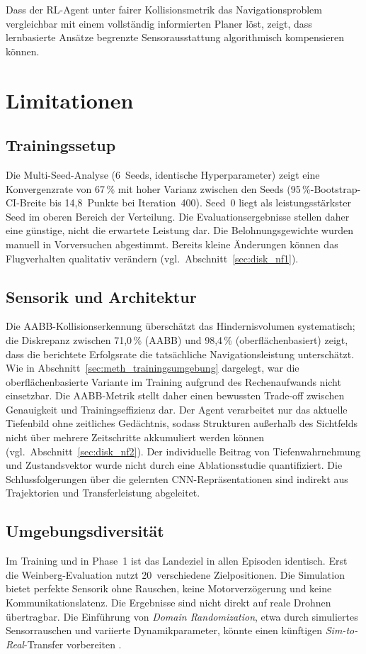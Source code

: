 Dass der RL-Agent unter fairer
Kollisionsmetrik das Navigationsproblem vergleichbar mit einem
vollständig informierten Planer löst, zeigt,
dass lernbasierte Ansätze begrenzte Sensorausstattung algorithmisch
kompensieren können.

\section{Limitationen}
\label{sec:disk_limitationen}


\subsection{Trainingssetup}

Die Multi-Seed-Analyse (6~Seeds, identische Hyperparameter) zeigt eine
Konvergenzrate von 67\,\% mit hoher Varianz zwischen den Seeds
(95\,\%-Bootstrap-CI-Breite bis 14,8~Punkte bei Iteration~400). Seed~0
liegt als leistungsstärkster Seed im oberen Bereich der Verteilung. Die
Evaluationsergebnisse stellen daher eine günstige, nicht die erwartete
Leistung dar. Die Belohnungsgewichte wurden manuell in Vorversuchen abgestimmt. Bereits
kleine Änderungen können das Flugverhalten qualitativ verändern
(vgl.\ Abschnitt~\ref{sec:disk_nf1}).

\subsection{Sensorik und Architektur}

Die AABB-Kollisionserkennung überschätzt das Hindernisvolumen
systematisch; die Diskrepanz zwischen 71,0\,\% (AABB) und 98,4\,\%
(oberflächenbasiert) zeigt, dass die berichtete Erfolgsrate die
tatsächliche Navigationsleistung unterschätzt. Wie in
Abschnitt~\ref{sec:meth_trainingsumgebung} dargelegt, war die
oberflächenbasierte Variante im Training aufgrund des Rechenaufwands
nicht einsetzbar. Die AABB-Metrik stellt daher einen bewussten
Trade-off zwischen Genauigkeit und Trainingseffizienz dar. Der Agent verarbeitet
nur das aktuelle Tiefenbild ohne zeitliches Gedächtnis, sodass
Strukturen außerhalb des Sichtfelds nicht über mehrere Zeitschritte
akkumuliert werden können (vgl.\ Abschnitt~\ref{sec:disk_nf2}). Der
individuelle Beitrag von Tiefenwahrnehmung und Zustandsvektor wurde
nicht durch eine Ablationsstudie quantifiziert. Die Schlussfolgerungen
über die gelernten CNN-Repräsentationen sind indirekt aus Trajektorien
und Transferleistung abgeleitet.

\subsection{Umgebungsdiversität}

Im Training und in Phase~1 ist das Landeziel in allen Episoden
identisch. Erst die Weinberg-Evaluation nutzt 20~verschiedene
Zielpositionen. Die Simulation bietet perfekte
Sensorik ohne Rauschen, keine Motorverzögerung und keine
Kommunikationslatenz. Die Ergebnisse sind nicht direkt auf reale Drohnen
übertragbar. Die Einführung von \textit{Domain Randomization}, etwa durch simuliertes Sensorrauschen und variierte Dynamikparameter, könnte einen künftigen \textit{Sim-to-Real}-Transfer vorbereiten \autocite{ladoszAutonomousLandingMoving2024,polvaraSimtoRealQuadrotorLanding2020}.
